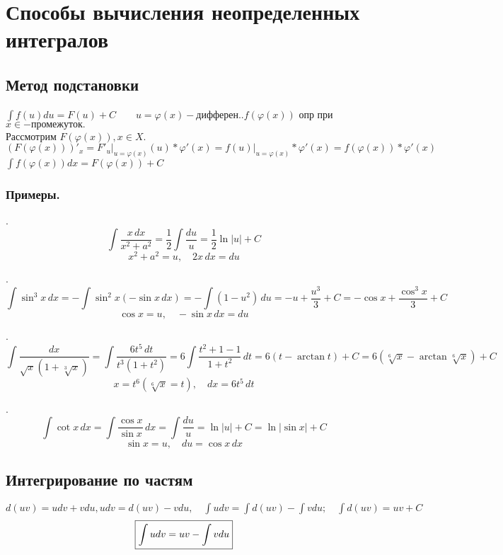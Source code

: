 \documentclass[../main.tex]{subfiles}
\begin{document}
\newpage
{}
\section{Способы вычисления неопределенных интегралов}
\subsection{Метод подстановки}
$\displaystyle\int f(u)du=F(u)+C\qquad u=\varphi(x) - \text{дифферен.}.f(\varphi(x))$ опр при$x \in-\text{промежуток}.$\\
Рассмотрим $F(\varphi(x)),x\in X.$ $(F(\varphi(x)))'_{x}=F'_{u}\bigg|_{u=\varphi(x)}(u)*\varphi'(x)=f(u)\bigg|_{u=\varphi(x)}*\varphi'(x)=f(\varphi(x))*\varphi'(x)$\\
$\displaystyle\int f(\varphi(x))dx=F(\varphi(x))+C$\\
\fbox{%
\begin{minipage}{\linewidth}
\[
\displaystyle\int f(\varphi(x))\underbrace{\varphi'(x)dx}_{du}=\int f(u)du\bigg|_{u=\varphi(x)}
\]
\[
\displaystyle\int f(x)dx\bigg|_{x=\psi(t)}=\int f(\psi(t))\psi'(t)dt\bigg|_{t=\psi^{-1}(x)}
\]
\end{minipage}
}

\subsubsection{Примеры.}

. 
\[
\int \frac{x \, dx}{x^{2} + a^{2}} = \frac{1}{2} \int \frac{du}{u} = \frac{1}{2} \ln{|u|} + C
\]
\[
x^{2} + a^{2} = u, \quad 2x \, dx = du
\]

. 
\[
\int \sin^{3}{x} \, dx = -\int \sin^{2}{x} (-\sin{x} \, dx) = -\int (1 - u^{2}) \, du = -u + \frac{u^{3}}{3} + C = -\cos{x} + \frac{\cos^{3}{x}}{3} + C
\]
\[
\cos{x} = u, \quad -\sin{x} \, dx = du
\]

. 
\[
\int \frac{dx}{\sqrt{x}(1 + \sqrt[3]{x})} = \int \frac{6t^{5} \, dt}{t^{3}(1 + t^{2})} = 6 \int \frac{t^{2} + 1 - 1}{1 + t^{2}} \, dt = 6(t - \arctan{t}) + C = 6(\sqrt[6]{x} - \arctan{\sqrt[6]{x}}) + C
\]
\[
x = t^{6} (\sqrt[6]{x} = t), \quad dx = 6t^{5} \, dt
\]

. 
\[
\int \cot{x} \, dx = \int \frac{\cos{x}}{\sin{x}} \, dx = \int \frac{du}{u} = \ln{|u|} + C = \ln{|\sin{x}|} + C
\]
\[
\sin{x} = u, \quad du = \cos{x} \, dx
\]

\subsection{Интегрирование по частям}
$d(uv)=udv+vdu,udv=d(uv)-vdu,\quad \displaystyle\int udv=\int d(uv)-\int vdu;\quad \int d(uv)=uv+C$\\
$$\fbox{\(\displaystyle \int  udv=uv-\int vdu\)}$$
\end{document}
